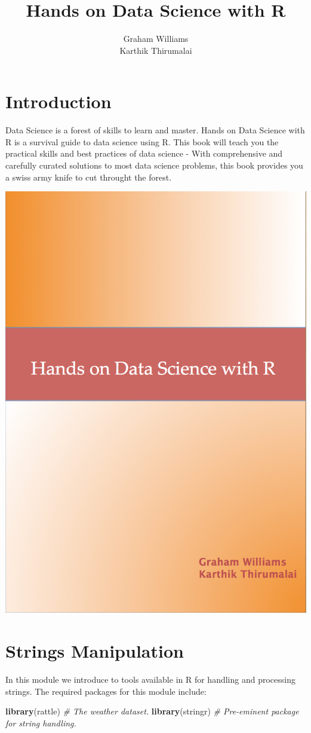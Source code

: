 \documentclass[]{book}
\title{Hands on Data Science with R}
\author{Graham Williams \\ Karthik Thirumalai}
\date{}
\newenvironment{Shaded}{\begin{snugshade}}{\end{snugshade}}
\newcommand{\KeywordTok}[1]{\textcolor[rgb]{0.13,0.29,0.53}{\textbf{{#1}}}}
\newcommand{\CommentTok}[1]{\textcolor[rgb]{0.56,0.35,0.01}{\textit{{#1}}}}
\newcommand{\NormalTok}[1]{{#1}}
\begin{document}
\maketitle


{
\hypersetup{linkcolor=black}
\setcounter{tocdepth}{2}
\tableofcontents
}
\section{Introduction}\label{introduction}

Data Science is a forest of skills to learn and master. Hands on Data
Science with R is a survival guide to data science using R. This book
will teach you the practical skills and best practices of data science -
With comprehensive and carefully curated solutions to most data science
problems, this book provides you a swiss army knife to cut throught the
forest.

\begin{center}\includegraphics[width=0.33\linewidth]{graphics/book-cover-A4} \end{center}

\section{Strings Manipulation}\label{strings-manipulation}

In this module we introduce to tools available in R for handling and
processing strings. The required packages for this module include:

\begin{Shaded}
\begin{Highlighting}[]
\KeywordTok{library}\NormalTok{(rattle) }\CommentTok{# The weather dataset.}
\KeywordTok{library}\NormalTok{(stringr) }\CommentTok{# Pre-eminent package for string handling.}
\end{Highlighting}
\end{Shaded}
\end{document}
